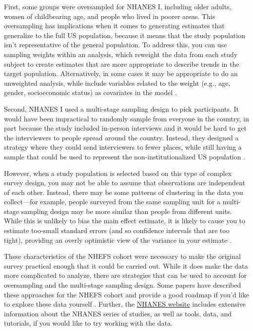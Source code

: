 \documentclass[
]{book}
\begin{document}
First, some groups were oversampled for NHANES I, including older adults, women of childbearing age, and people who lived in poorer areas. This oversampling has implications when it comes to generating estimates that generalize to the full US population, because it means that the study population isn't representative of the general population. To address this, you can use sampling weights within an analysis, which reweight the data from each study subject to create estimates that are more appropriate to describe trends in the target population. Alternatively, in some cases it may be appropriate to do an unweighted analysis, while include variables related to the weight (e.g., age, gender, socioeconomic status) as covariates in the model \citep{korn1991epidemiologic}.

Second, NHANES I used a multi-stage sampling design to pick participants. It would have been impractical to randomly sample from everyone in the country, in part because the study included in-person interviews and it would be hard to get the interviewers to people spread around the country. Instead, they designed a strategy where they could send interviewers to fewer places, while still having a sample that could be used to represent the non-institutionalized US population \citep{korn1991epidemiologic}.

However, when a study population is selected based on this type of complex survey design, you may not be able to assume that observations are independent of each other. Instead, there may be some patterns of clustering in the data you collect---for example, people surveyed from the same sampling unit for a multi-stage sampling design may be more similar than people from different units. While this is unlikely to bias the main effect estimate, it is likely to cause you to estimate too-small standard errors (and so confidence intervals that are too tight), providing an overly optimistic view of the variance in your estimate \citep{korn1991epidemiologic}.

These characteristics of the NHEFS cohort were necessary to make the original survey practical enough that it could be carried out. While it does make the data more complicated to analyze, there are strategies that can be used to account for oversampling and the multi-stage sampling design. Some papers have described these approaches for the NHEFS cohort and provide a good roadmap if you'd like to explore these data yourself \citep{korn1991epidemiologic, ingram1994statistical}. Further, the \href{https://www.cdc.gov/nchs/nhanes/index.htm}{NHANES website} includes extensive information about the NHANES series of studies, as well as tools, data, and tutorials, if you would like to try working with the data.
\end{document}
